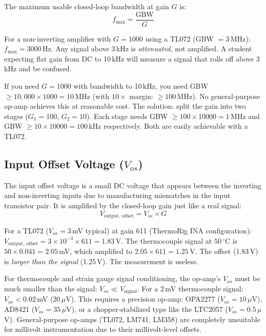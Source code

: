 \documentclass[11pt,letterpaper,twoside,openany]{book}
\newcommand{\degC}{\ensuremath{{}^{\circ}\text{C}}}
\begin{document}
The maximum usable closed-loop bandwidth at gain $G$ is:
\begin{equation}
f_{\text{max}} = \frac{\text{GBW}}{G}
\end{equation}

For a non-inverting amplifier with $G = 1000$ using a TL072 (GBW $= 3$\,MHz): $f_{\text{max}} = 3000$\,Hz. Any signal above 3\,kHz is \emph{attenuated}, not amplified. A student expecting flat gain from DC to 10\,kHz will measure a signal that rolls off above 3\,kHz and be confused.

\begin{warningbox}
If you need $G = 1000$ with bandwidth to 10\,kHz, you need GBW $\geq 10{,}000 \times 1000 = 10$\,MHz (with $10\times$ margin: $\geq 100$\,MHz). No general-purpose op-amp achieves this at reasonable cost. The solution: split the gain into two stages ($G_1 = 100$, $G_2 = 10$). Each stage needs GBW $\geq 100 \times 10000 = 1$\,MHz and GBW $\geq 10 \times 10000 = 100$\,kHz respectively. Both are easily achievable with a TL072.
\end{warningbox}

\subsection{Input Offset Voltage ($V_{os}$)}
The input offset voltage is a small DC voltage that appears between the inverting and non-inverting inputs due to manufacturing mismatches in the input transistor pair. It is amplified by the closed-loop gain just like a real signal:
\begin{equation}
V_{\text{output, offset}} = V_{os} \times G
\end{equation}

For a TL072 ($V_{os} = 3$\,mV typical) at gain 611 (ThermoRig INA configuration): $V_{\text{output, offset}} = 3 \times 10^{-3} \times 611 = 1.83$\,V. The thermocouple signal at 50\,\degC{} is $50 \times 0.041 = 2.05$\,mV, which amplified to $2.05 \times 611 = 1.25$\,V. The offset (1.83\,V) is \emph{larger than the signal} (1.25\,V). The measurement is useless.

\begin{warningbox}
For thermocouple and strain gauge signal conditioning, the op-amp's $V_{os}$ must be much smaller than the signal: $V_{os} \ll V_{\text{signal}}$. For a 2\,mV thermocouple signal: $V_{os} < 0.02$\,mV ($20\,\mu$V). This requires a precision op-amp: OPA2277 ($V_{os} = 10\,\mu$V), AD8421 ($V_{os} = 35\,\mu$V), or a chopper-stabilized type like the LTC2057 ($V_{os} = 0.5\,\mu$V). General-purpose op-amps (TL072, LM741, LM358) are completely unsuitable for millivolt instrumentation due to their millivolt-level offsets.
\end{warningbox}
\end{document}
